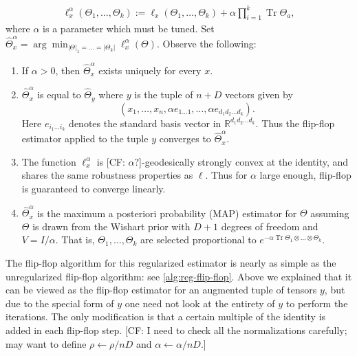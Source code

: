 \documentclass[aos]{imsart}
\theoremstyle{definition}
\numberwithin{equation}{section}
\DeclareMathOperator{\tr}{Tr}
\newcommand{\R}{{\mathbb{R}}}
\newcommand{\ot}{\otimes}
\newcommand{\samp}{x}
\newcommand{\CF}[1]{{\color{purple}[CF: #1]}}
\begin{document}
\begin{align*}
  \ell_{\samp}^\alpha(\Theta_1, \dots, \Theta_k)
  := \ell_{\samp}(\Theta_1, \dots, \Theta_k) + \alpha \prod_{i=1}^k \tr \Theta_a,
\end{align*}
where $\alpha$ is a parameter which must be tuned. Set $\widehat{\Theta}^\alpha_x = \arg\min_{|\Theta|_1 =\dots =  |\Theta_k|} \ell^\alpha_\samp(\Theta)$.
Observe the following:
\begin{enumerate}
\item If $\alpha > 0$, then $\widehat{\Theta}^\alpha_x$ exists uniquely for every $x$.
\item $\widehat{\Theta}^\alpha_x$ is equal to $\widehat{\Theta}_{y}$ where $y$ is the tuple of $n + D$ vectors given by
$$(x_1, \dots, x_n, \alpha e_{1\dots 1}, \dots, \alpha e_{d_1d_2 \dots d_k}).$$ Here $e_{i_1 \dots i_k}$ denotes the standard basis vector in $\R^{d_1d_2 \dots d_k}$. Thus the flip-flop estimator applied to the tuple $y$ converges to $\widehat{\Theta}^\alpha_x$.
\item The function $\ell^\alpha_\samp$ is \CF{$\alpha?$}-geodesically strongly convex at the identity, and shares the same robustness properties as $\ell$. Thus for $\alpha$ large enough, flip-flop is guaranteed to converge linearly.
\item $\widehat{\Theta}^\alpha_\samp$ is the maximum a posteriori probability (MAP) estimator for $\Theta$ assuming $\Theta$ is drawn from the Wishart prior with $D + 1$ degrees of freedom and $V = I/\alpha$. That is, $\Theta_1, \dots, \Theta_k$ are selected proportional to $e^{- \alpha \tr \Theta_1 \ot \dots \ot \Theta_k}.$
\end{enumerate}


The flip-flop algorithm for this regularized estimator is nearly as simple as the unregularized flip-flop algorithm: see \cref{alg:reg-flip-flop}. Above we explained that it can be viewed as the flip-flop estimator for an augmented tuple of tensors $y$, but due to the special form of $y$ one need not look at the entirety of $y$ to perform the iterations. The only modification is that a certain multiple of the identity is added in each flip-flop step.  \CF{I need to check all the normalizations carefully; may want to define $\rho \leftarrow \rho/nD$ and $\alpha \leftarrow \alpha/nD$.}
\end{document}

